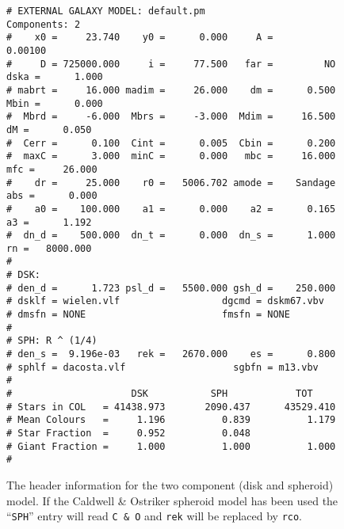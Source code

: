 \begin{figure}[p]
\begin{center}
\begin{verbatim}
# EXTERNAL GALAXY MODEL: default.pm                          Components: 2 
#    x0 =     23.740    y0 =      0.000     A =      0.00100
#     D = 725000.000     i =     77.500   far =         NO  dska =      1.000
# mabrt =     16.000 madim =     26.000    dm =      0.500  Mbin =      0.000
#  Mbrd =     -6.000  Mbrs =     -3.000  Mdim =     16.500    dM =      0.050
#  Cerr =      0.100  Cint =      0.005  Cbin =      0.200
#  maxC =      3.000  minC =      0.000   mbc =     16.000   mfc =     26.000
#    dr =     25.000    r0 =   5006.702 amode =    Sandage   abs =      0.000
#    a0 =    100.000    a1 =      0.000    a2 =      0.165    a3 =      1.192
#  dn_d =    500.000  dn_t =      0.000  dn_s =      1.000    rn =   8000.000
#
# DSK:
# den_d =      1.723 psl_d =   5500.000 gsh_d =    250.000
# dsklf = wielen.vlf                  dgcmd = dskm67.vbv              
# dmsfn = NONE                        fmsfn = NONE                    
#
# SPH: R ^ (1/4)
# den_s =  9.196e-03   rek =   2670.000    es =      0.800
# sphlf = dacosta.vlf                   sgbfn = m13.vbv                 
#
#                     DSK           SPH            TOT
# Stars in COL   = 41438.973       2090.437      43529.410
# Mean Colours   =     1.196          0.839          1.179
# Star Fraction  =     0.952          0.048
# Giant Fraction =     1.000          1.000          1.000
#
\end{verbatim}
\end{center}
\caption{The header information for the two component (disk and spheroid)
model. If the Caldwell \& Ostriker spheroid model has been used the 
``{\tt SPH}'' entry will read {\tt C \& O} and {\tt rek} will be replaced by 
{\tt rco}.}
\end{figure}


